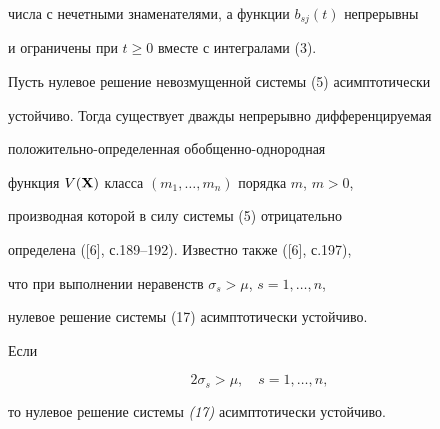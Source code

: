 числа с нечетными знаменателями, а функции $b_{sj}(t)$ непрерывны 


и ограничены при $t\ge 0$ вместе с интегралами (3). 


 


Пусть нулевое решение невозмущенной системы (5) асимптотически 


устойчиво. Тогда существует дважды непрерывно дифференцируемая 


положительно-определенная обобщенно-одно\-родная 


функция $V(\bold X)$ класса $(m_1,\dotsc,m_n)$ порядка $m$, $m>0$, 


производная которой в силу системы (5) отрицательно 


определена ([6], с.189--192). Известно также ([6], с.197), 


что при выполнении неравенств $\sigma_s>\mu$, $s=1,\dotsc,n$, 


нулевое решение системы (17) асимптотически устойчиво. 


 


\begin{thm} Если 


\begin{equation} 


2\sigma_s>\mu,\quad s=1,\dotsc,n, 


\end{equation} 


то нулевое решение системы {\em (17)} асимптотически устойчиво. 


\end{thm} 


 


